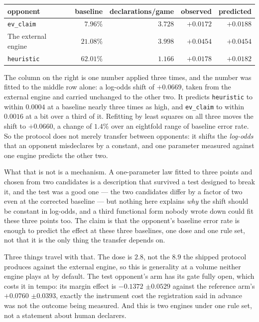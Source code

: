 \documentclass[11pt,letterpaper]{article}
\begin{document}
\begin{center}
\small
\begin{tabular}{lrrrr}
\toprule
opponent & baseline & declarations/game & observed & predicted \\
\midrule
\texttt{ev\_claim}  & $7.96\%$  & $3.728$ & $+0.0172$ & $+0.0188$ \\
The external engine & $21.08\%$ & $3.998$ & $+0.0454$ & $+0.0454$ \\
\texttt{heuristic}  & $62.01\%$ & $1.166$ & $+0.0178$ & $+0.0182$ \\
\bottomrule
\end{tabular}
\end{center}

\noindent The column on the right is one number applied three times, and the
number was fitted to the middle row alone: a log-odds shift of $+0.0669$,
taken from the external engine and carried unchanged to the other two. It
predicts \texttt{heuristic} to within $0.0004$ at a baseline nearly three
times as high, and \texttt{ev\_claim} to within $0.0016$ at a bit over a
third of it. Refitting by least squares on all three moves the shift to
$+0.0660$, a change of $1.4\%$ over an eightfold range of baseline error rate.
So the protocol does not merely transfer between opponents: it shifts the
\emph{log-odds} that an opponent misdeclares by a constant, and one parameter
measured against one engine predicts the other two.

What that is not is a mechanism. A one-parameter law fitted to three points and
chosen from two candidates is a description that survived a test designed to
break it, and the test was a good one --- the two candidates differ by a factor
of two even at the corrected baseline --- but nothing here explains \emph{why}
the shift should be constant in log-odds, and a third functional form nobody
wrote down could fit these three points too. The claim is that the opponent's
baseline error rate is enough to predict the effect at these three baselines,
one dose and one rule set, not that it is the only thing the transfer depends
on.

Three things travel with that. The dose is $2.8$, not the $8.9$ the shipped
protocol produces against the external engine, so this is generality at a
volume neither engine plays at by default. The test opponent's arm has its gate
fully open, which costs it in tempo: its margin effect is $-0.1372$ $\pm
0.0529$ against the reference arm's $+0.0760$ $\pm 0.0393$, exactly the
instrument cost the registration said in advance was not the outcome being
measured. And this is two engines under one rule set, not a statement about
human declarers.
\end{document}
